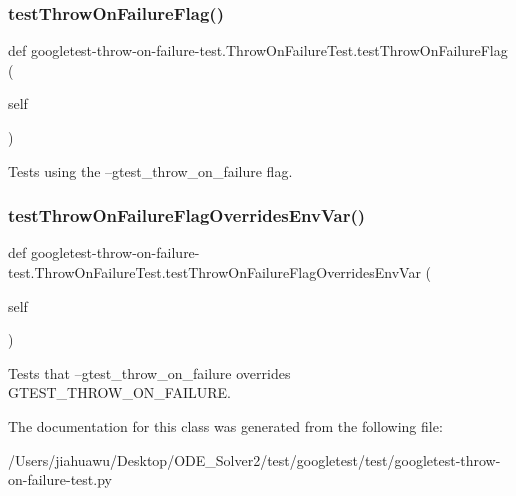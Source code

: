 \subsubsection{\texorpdfstring{test\+Throw\+On\+Failure\+Flag()}{testThrowOnFailureFlag()}}
{\footnotesize\ttfamily def googletest-\/throw-\/on-\/failure-\/test.\+Throw\+On\+Failure\+Test.\+test\+Throw\+On\+Failure\+Flag (\begin{DoxyParamCaption}\item[{}]{self }\end{DoxyParamCaption})}

\begin{DoxyVerb}Tests using the --gtest_throw_on_failure flag.\end{DoxyVerb}
 \mbox{\label{classgoogletest-throw-on-failure-test_1_1_throw_on_failure_test_a18515553dbfe7b3e6ed6449fa81893c1}} 
\subsubsection{\texorpdfstring{test\+Throw\+On\+Failure\+Flag\+Overrides\+Env\+Var()}{testThrowOnFailureFlagOverridesEnvVar()}}
{\footnotesize\ttfamily def googletest-\/throw-\/on-\/failure-\/test.\+Throw\+On\+Failure\+Test.\+test\+Throw\+On\+Failure\+Flag\+Overrides\+Env\+Var (\begin{DoxyParamCaption}\item[{}]{self }\end{DoxyParamCaption})}

\begin{DoxyVerb}Tests that --gtest_throw_on_failure overrides GTEST_THROW_ON_FAILURE.\end{DoxyVerb}
 

The documentation for this class was generated from the following file\+:\begin{DoxyCompactItemize}
\item 
/\+Users/jiahuawu/\+Desktop/\+O\+D\+E\+\_\+\+Solver2/test/googletest/test/googletest-\/throw-\/on-\/failure-\/test.\+py\end{DoxyCompactItemize}

